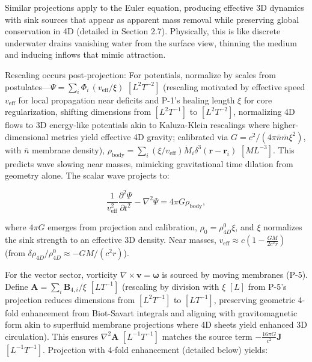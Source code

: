 Similar projections apply to the Euler equation, producing effective 3D dynamics with sink sources that appear as apparent mass removal while preserving global conservation in 4D (detailed in Section 2.7). Physically, this is like discrete underwater drains vanishing water from the surface view, thinning the medium and inducing inflows that mimic attraction.

Rescaling occurs post-projection: For potentials, normalize by scales from postulates---$\Psi = \sum_i \Phi_i \, (v_{\text{eff}} / \xi)$ $[L^2 T^{-2}]$ (rescaling motivated by effective speed $v_{\text{eff}}$ for local propagation near deficits and P-1's healing length $\xi$ for core regularization, shifting dimensions from $[L^2 T^{-1}]$ to $[L^2 T^{-2}]$, normalizing 4D flows to 3D energy-like potentials akin to Kaluza-Klein rescalings where higher-dimensional metrics yield effective 4D gravity; calibrated via $G = c^2 / (4\pi \bar{n} \bar{m} \xi^2)$, with $\bar{n}$ membrane density), $\rho_{\text{body}} = \sum_i \left( \xi / v_{\text{eff}} \right) \dot{M}_i \delta^3(\mathbf{r} - \mathbf{r}_i)$ $[M L^{-3}]$. This predicts wave slowing near masses, mimicking gravitational time dilation from geometry alone. The scalar wave projects to:

\begin{equation}
\frac{1}{v_{\text{eff}}^2} \frac{\partial^2 \Psi}{\partial t^2} - \nabla^2 \Psi = 4\pi G \rho_{\text{body}},
\end{equation}

where $4\pi G$ emerges from projection and calibration, $\rho_0 = \rho_{4D}^0 \xi$, and $\xi$ normalizes the sink strength to an effective 3D density. Near masses, $v_{\text{eff}} \approx c \left(1 - \frac{G M}{2 c^2 r}\right)$ (from $\delta \rho_{4D} / \rho_{4D}^0 \approx - G M / (c^2 r)$).

For the vector sector, vorticity $\nabla \times \mathbf{v} = \boldsymbol{\omega}$ is sourced by moving membranes (P-5). Define $\mathbf{A} = \sum_i \mathbf{B}_{4,i} / \xi$ $[L T^{-1}]$ (rescaling by division with $\xi$ $[L]$ from P-5's projection reduces dimensions from $[L^2 T^{-1}]$ to $[L T^{-1}]$, preserving geometric 4-fold enhancement from Biot-Savart integrals and aligning with gravitomagnetic form akin to superfluid membrane projections where 4D sheets yield enhanced 3D circulation). This ensures $\nabla^2 \mathbf{A}$ $[L^{-1} T^{-1}]$ matches the source term $-\frac{16\pi G}{c^2} \mathbf{J}$ $[L^{-1} T^{-1}]$. Projection with 4-fold enhancement (detailed below) yields:

